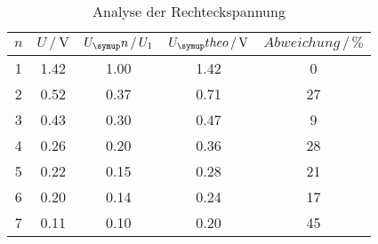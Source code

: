\begin{table}
  \centering
  \begin{tabular}{c c c c c}
    \toprule
    $n$ & $U \,/\,\si{\volt}$ & $U_\su{n}\,/\,U_1$ & $U_\su{theo}\,/\,\si{\volt}$
    & $Abweichung\,/\, \%$ \\
    \midrule
    1   &   1.42  &   1.00  &   1.42    & 0  \\
    2   &   0.52  &   0.37  &   0.71    & 27 \\
    3   &   0.43  &   0.30  &   0.47    & 9  \\
    4   &   0.26  &   0.20  &   0.36    & 28  \\
    5   &   0.22  &   0.15  &   0.28    & 21  \\
    6   &   0.20  &   0.14  &   0.24    & 17  \\
    7   &   0.11  &   0.10  &   0.20    & 45  \\
    \bottomrule
  \end{tabular}
  \caption{Analyse der Rechteckspannung}
  \label{tab:anarecht}
\end{table}
